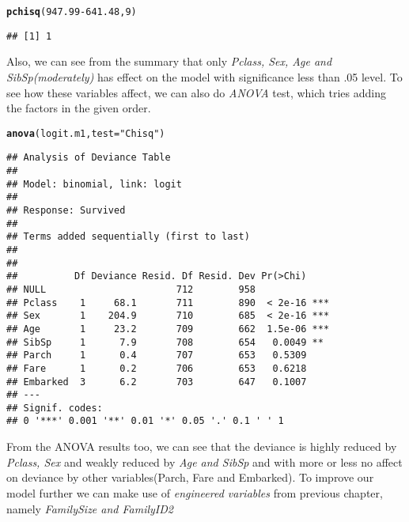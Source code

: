 \documentclass[a4paper,10pt]{report}\usepackage[]{graphicx}\usepackage[]{color}
\makeatletter
\newcommand{\hlnum}[1]{\textcolor[rgb]{0.686,0.059,0.569}{#1}}%
\newcommand{\hlstr}[1]{\textcolor[rgb]{0.192,0.494,0.8}{#1}}%
\newcommand{\hlopt}[1]{\textcolor[rgb]{0,0,0}{#1}}%
\newcommand{\hlstd}[1]{\textcolor[rgb]{0.345,0.345,0.345}{#1}}%
\newcommand{\hlkwc}[1]{\textcolor[rgb]{0.333,0.667,0.333}{#1}}%
\newcommand{\hlkwd}[1]{\textcolor[rgb]{0.737,0.353,0.396}{\textbf{#1}}}%
\newenvironment{kframe}{%
 \def\at@end@of@kframe{}%
 \ifinner\ifhmode%
  \def\at@end@of@kframe{\end{minipage}}%
  \begin{minipage}{\columnwidth}%
 \fi\fi%
 \def\FrameCommand##1{\hskip\@totalleftmargin \hskip-\fboxsep
 \colorbox{shadecolor}{##1}\hskip-\fboxsep
     \hskip-\linewidth \hskip-\@totalleftmargin \hskip\columnwidth}%
 \MakeFramed {\advance\hsize-\width
   \@totalleftmargin\z@ \linewidth\hsize
   \@setminipage}}%
 {\par\unskip\endMakeFramed%
 \at@end@of@kframe}
\newenvironment{knitrout}{}{} %
\makeatother
\begin{document}
\begin{knitrout}
\color{fgcolor}\begin{kframe}
\begin{alltt}
\hlkwd{pchisq}\hlstd{(}\hlnum{947.99}\hlopt{-}\hlnum{641.48}\hlstd{,} \hlnum{9}\hlstd{)}
\end{alltt}
\begin{verbatim}
## [1] 1
\end{verbatim}
\end{kframe}
\end{knitrout}
Also, we can see from the summary that only \emph{Pclass, Sex, Age and SibSp(moderately)} has effect on the model with significance less than .05 level. To see how these variables affect, we can also do \emph{ANOVA} test, which tries adding the factors in the given order.
\begin{knitrout}
\color{fgcolor}\begin{kframe}
\begin{alltt}
\hlkwd{anova}\hlstd{(logit.m1,} \hlkwc{test}\hlstd{=}\hlstr{"Chisq"}\hlstd{)}
\end{alltt}
\begin{verbatim}
## Analysis of Deviance Table
## 
## Model: binomial, link: logit
## 
## Response: Survived
## 
## Terms added sequentially (first to last)
## 
## 
##          Df Deviance Resid. Df Resid. Dev Pr(>Chi)    
## NULL                       712        958             
## Pclass    1     68.1       711        890  < 2e-16 ***
## Sex       1    204.9       710        685  < 2e-16 ***
## Age       1     23.2       709        662  1.5e-06 ***
## SibSp     1      7.9       708        654   0.0049 ** 
## Parch     1      0.4       707        653   0.5309    
## Fare      1      0.2       706        653   0.6218    
## Embarked  3      6.2       703        647   0.1007    
## ---
## Signif. codes:  
## 0 '***' 0.001 '**' 0.01 '*' 0.05 '.' 0.1 ' ' 1
\end{verbatim}
\end{kframe}
\end{knitrout}
From the ANOVA results too, we can see that the deviance is highly reduced by \emph{Pclass, Sex} and weakly reduced by \emph{Age and SibSp} and with more or less no affect on deviance by other variables(Parch, Fare and Embarked).
To improve our model further we can make use of \emph{engineered variables} from previous chapter, namely \emph{FamilySize and FamilyID2}
\end{document}
